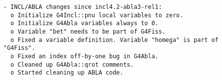 \begin{verbatim}
- INCL/ABLA changes since incl4.2-abla3-rel1:
  o Initialize G4Incl::pnu local variables to zero.
  o Initialize G4Abla variables always to 0.
  o Variable "bet" needs to be part of G4Fiss.
  o Fixed a variable definition. Variable "homega" is part of "G4Fiss".
  o Fixed an index off-by-one bug in G4Abla.
  o Cleaned up G4Abla::qrot comments.
  o Started cleaning up ABLA code.
\end{verbatim}
